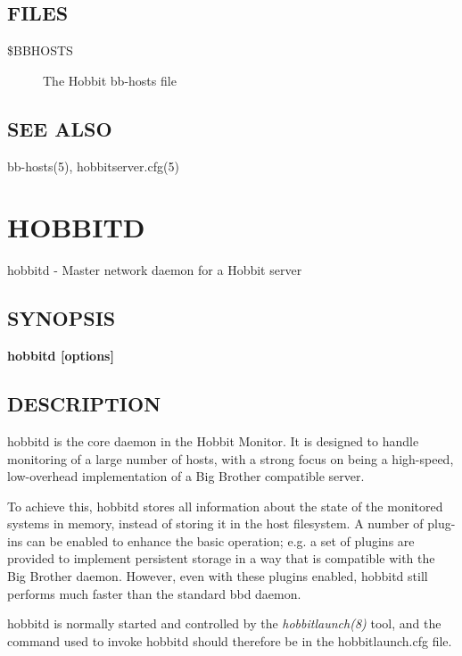 \subsection{FILES}
\begin{description}
\item[\$BBHOSTS] The Hobbit bb-hosts file 

 


\end{description}
\subsection{SEE ALSO}
bb-hosts(5), hobbitserver.cfg(5) 

  
%
\newpage
\section{HOBBITD}

 hobbitd - Master network daemon for a Hobbit server
 \subsection{SYNOPSIS}
\textbf{hobbitd [options]}


 
\subsection{DESCRIPTION}
 hobbitd is the core daemon in the Hobbit Monitor. It is designed to handle monitoring of a large number of hosts, with a strong focus on being a high-speed, low-overhead implementation of a Big Brother compatible server. 

  To achieve this, hobbitd stores all information about the state of the monitored systems in memory, instead of storing it in the host filesystem. A number of plug-ins can be enabled to enhance the basic operation; e.g. a set of plugins are provided to implement persistent storage in a way that is compatible with the Big Brother daemon. However, even with these plugins enabled, hobbitd still performs much faster than the standard bbd daemon. 


  hobbitd is normally started and controlled by the \emph{hobbitlaunch(8)}
 tool, and the command used to invoke hobbitd should therefore be in the hobbitlaunch.cfg file. 


